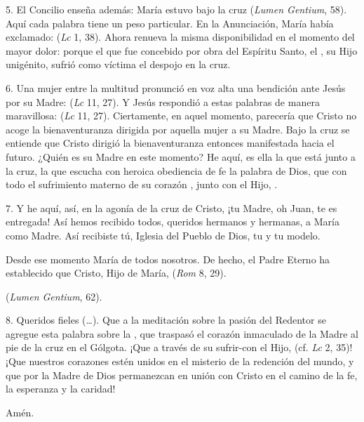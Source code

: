\begin{body}
5. El Concilio enseña además: María estuvo bajo la cruz  (\textit{Lumen Gentium}, 58). Aquí cada palabra tiene un peso particular. En la Anunciación, María había exclamado:  (\textit{Lc} 1, 38). Ahora renueva la misma disponibilidad en el momento del mayor dolor:  porque el que fue concebido por obra del Espíritu Santo, el , su Hijo unigénito, sufrió como víctima el despojo en la cruz. 

6. Una mujer entre la multitud pronunció en voz alta una bendición ante Jesús por su Madre:  (\textit{Lc} 11, 27). Y Jesús respondió a estas palabras de manera maravillosa:  (\textit{Lc} 11, 27). Ciertamente, en aquel momento, parecería que Cristo no acoge la bienaventuranza dirigida por aquella mujer a su Madre. Bajo la cruz se entiende que Cristo dirigió la bienaventuranza entonces manifestada hacia el futuro. ¿Quién es su Madre en este momento? He aquí, es ella la que está junto a la cruz, la que escucha con heroica obediencia de fe la palabra de Dios, que con todo el sufrimiento materno de su corazón , junto con el Hijo, . 

7. Y he aquí, así, en la agonía de la cruz de Cristo, ¡tu Madre, oh Juan, te es entregada! Así hemos recibido todos, queridos hermanos y hermanas, a María como Madre. Así recibiste tú, Iglesia del Pueblo de Dios, tu  y tu modelo. 


Desde ese momento María  de todos nosotros. De hecho, el Padre Eterno ha establecido que Cristo, Hijo de María,  (\textit{Rom} 8, 29). 

 (\textit{Lumen Gentium}, 62). 

8. Queridos fieles (\ldots). Que a la meditación sobre la pasión del Redentor se agregue esta palabra sobre la , que traspasó el corazón inmaculado de la Madre al pie de la cruz en el Gólgota. ¡Que a través de su sufrir-con el Hijo,  (cf. \textit{Lc} 2, 35)! ¡Que nuestros corazones estén unidos en el misterio de la redención del mundo, y que por la Madre de Dios permanezcan en unión con Cristo en el camino de la fe, la esperanza y la caridad! 

Amén.
\end{body}


